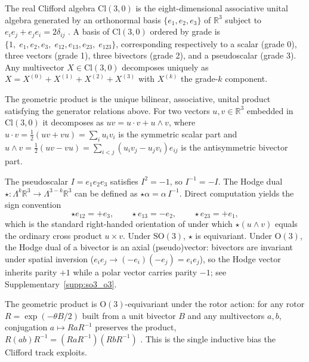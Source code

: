 The real Clifford algebra $\mathrm{Cl}(3,0)$ is the eight-dimensional associative unital algebra generated by an orthonormal basis $\{e_1, e_2, e_3\}$ of $\mathbb{R}^3$ subject to $e_ie_j + e_je_i = 2\delta_{ij}$ \citep{lounesto2001clifford,doran2003geometric}. A basis of $\mathrm{Cl}(3,0)$ ordered by grade is $\{1,\; e_1, e_2, e_3,\; e_{12}, e_{13}, e_{23},\; e_{123}\}$, corresponding respectively to a scalar (grade 0), three vectors (grade 1), three bivectors (grade 2), and a pseudoscalar (grade 3). Any multivector $X \in \mathrm{Cl}(3,0)$ decomposes uniquely as $X = X^{(0)} + X^{(1)} + X^{(2)} + X^{(3)}$ with $X^{(k)}$ the grade-$k$ component.

The geometric product is the unique bilinear, associative, unital product satisfying the generator relations above. For two vectors $u, v \in \mathbb{R}^3$ embedded in $\mathrm{Cl}(3,0)$ it decomposes as $uv = u \cdot v + u \wedge v$, where $u \cdot v = \tfrac{1}{2}(uv + vu) = \sum_i u_iv_i$ is the symmetric scalar part and $u \wedge v = \tfrac{1}{2}(uv - vu) = \sum_{i<j}(u_iv_j - u_jv_i)e_{ij}$ is the antisymmetric bivector part.

The pseudoscalar $I = e_1e_2e_3$ satisfies $I^2 = -1$, so $I^{-1} = -I$. The Hodge dual $\star: \Lambda^k\mathbb{R}^3 \to \Lambda^{3-k}\mathbb{R}^3$ can be defined as $\star\alpha = \alpha\, I^{-1}$. Direct computation yields the sign convention
\[
\star e_{12} = +e_3,\qquad \star e_{13} = -e_2,\qquad \star e_{23} = +e_1,
\]
which is the standard right-handed orientation of \citet{doran2003geometric,lounesto2001clifford} under which $\star(u\wedge v)$ equals the ordinary cross product $u\times v$. Under $\mathrm{SO}(3)$, $\star$ is equivariant. Under $\mathrm{O}(3)$, the Hodge dual of a bivector is an axial (pseudo)vector: bivectors are invariant under spatial inversion ($e_ie_j \to (-e_i)(-e_j) = e_ie_j$), so the Hodge vector inherits parity $+1$ while a polar vector carries parity $-1$; see Supplementary~\ref{supp:so3_o3}.

The geometric product is $\mathrm{O}(3)$-equivariant under the rotor action: for any rotor $R = \exp(-\theta B/2)$ built from a unit bivector $B$ and any multivectors $a, b$, conjugation $a \mapsto RaR^{-1}$ preserves the product, $R(ab)R^{-1} = (RaR^{-1})(RbR^{-1})$ \citep{doran2003geometric}. This is the single inductive bias the Clifford track exploits.


